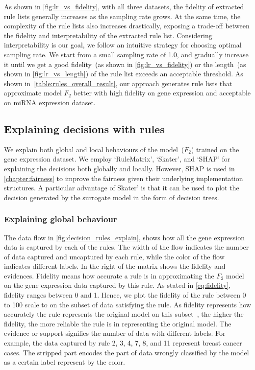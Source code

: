 \hspace*{3.5mm} As shown in \cref{fig:lr_vs_fidelity}, with all three datasets, the fidelity of extracted rule lists generally increases as the sampling rate grows. At the same time, the complexity of the rule lists also increases drastically, exposing a trade-off between the fidelity and interpretability of the extracted rule list. Considering interpretability is our goal, we follow an intuitive strategy for choosing optimal sampling rate. We  start from a small sampling rate of 1.0, and gradually increase it until we get a good fidelity~(as shown in \cref{fig:lr_vs_fidelity}) or the length~(as shown in \cref{fig:lr_vs_length}) of the rule list exceeds an acceptable threshold. As shown in~\cref{table:rules_overall_result}, our approach generates rule lists that approximate model $F_2$ better with high fidelity on gene expression and acceptable on miRNA expression dataset. 

\subsection{Explaining decisions with rules}
We explain both global and local behaviours of the model~($F_2$) trained on the gene expression dataset. We employ `RuleMatrix', `Skater', and `SHAP' for explaining the decisions both globally and locally. However, SHAP is used in \cref{chapter:fairness} to improve the fairness given their underlying implementation structures. A particular advantage of Skater' is that it can be used to plot the decision generated by the surrogate model in the form of decision trees. 

\subsubsection{Explaining global behaviour}
The data flow in \cref{fig:decision_rules_explain}, shows how all the gene expression data is captured by each of the rules. The width of the flow indicates the number of data captured and uncaptured by each rule, while the color of the flow indicates different labels. In the right of the matrix shows the fidelity and evidences. Fidelity means how accurate a rule is in approximating the $F_2$ model on the gene expression data captured by this rule. 
As stated in \cref{eq:fidelity}, fidelity ranges between 0 and 1. Hence, we plot the fidelity of the rule between 0 to 100 scale to on the subset of data satisfying the rule. As fidelity represents how accurately the rule represents the original model on this subset~\cite{ming2018rulematrix}, the higher the fidelity, the more reliable the rule is in representing the original model. The evidence or support signifies the number of data with different labels. For example, the data captured by rule 2, 3, 4, 7, 8, and 11 represent breast cancer cases. The stripped part encodes the part of data wrongly classified by the model as a certain label represent by the color.


